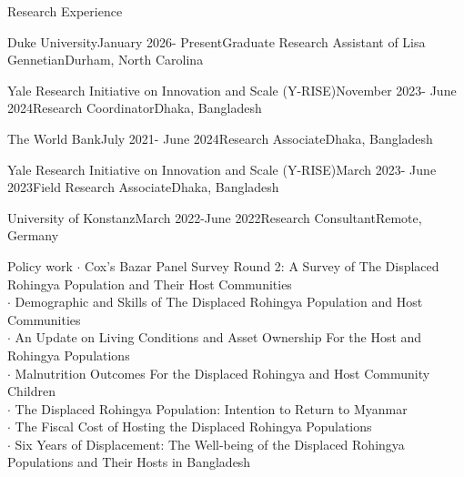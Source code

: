 \documentclass[
	9pt %
]{resume} %
\begin{document}
\vspace{-6pt}
\begin{rSection}{Research Experience}

	\begin{rSubsection}{Duke University}{January 2026- Present}{Graduate Research Assistant of Lisa Gennetian}{Durham, North Carolina}
	\end{rSubsection}

	\begin{rSubsection}{Yale Research Initiative on Innovation and Scale (Y-RISE)}{November 2023- June 2024}{Research Coordinator}{Dhaka, Bangladesh}
	\end{rSubsection}

	\begin{rSubsection}{The World Bank}{July 2021- June 2024}{Research Associate}{Dhaka, Bangladesh}	
	\end{rSubsection}

	\begin{rSubsection}{Yale Research Initiative on Innovation and Scale (Y-RISE)}{March 2023- June 2023}{Field Research Associate}{Dhaka, Bangladesh}
	\end{rSubsection}

	
	\begin{rSubsection}{University of Konstanz}{March 2022-June 2022}{Research Consultant}{Remote, Germany}
	\end{rSubsection}

\end{rSection}


\newpage

\vspace{-10pt}
\begin{rSection}{Policy work}
$\cdot$ Cox’s Bazar Panel Survey Round 2: A Survey of The Displaced Rohingya Population and Their Host Communities  \\
$\cdot$ Demographic and Skills of The Displaced Rohingya Population and Host Communities  \\
$\cdot$ An Update on Living Conditions and Asset Ownership For the Host and Rohingya Populations  \\
$\cdot$ Malnutrition Outcomes For the Displaced Rohingya and Host Community Children  \\
$\cdot$ The Displaced Rohingya Population: Intention to Return to Myanmar  \\
$\cdot$ The Fiscal Cost of Hosting the Displaced Rohingya Populations \\
$\cdot$ Six Years of Displacement: The Well-being of the Displaced Rohingya Populations and Their Hosts in Bangladesh  \\
\end{rSection}
\end{document}
